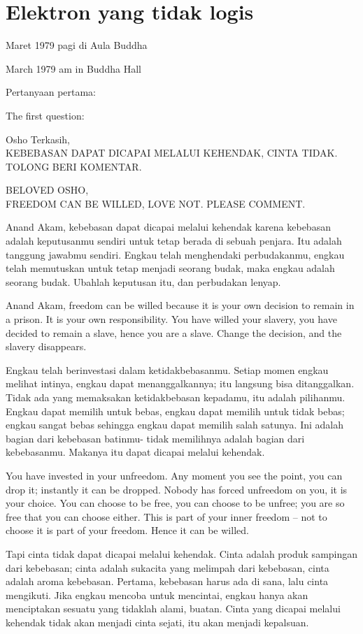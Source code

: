 \chapter{Elektron yang tidak logis} %

 Maret 1979 pagi di Aula Buddha

 March 1979 am in Buddha Hall

\bahasa
Pertanyaan pertama:

\english
The first question:

\bahasa
Osho Terkasih,\\
KEBEBASAN DAPAT DICAPAI MELALUI KEHENDAK, CINTA TIDAK. TOLONG BERI KOMENTAR.

\english
BELOVED OSHO,\\
FREEDOM CAN BE WILLED, LOVE NOT. PLEASE COMMENT.

\bahasa
Anand Akam, kebebasan dapat dicapai melalui kehendak karena kebebasan adalah keputusanmu sendiri untuk tetap berada di sebuah penjara. Itu adalah tanggung jawabmu sendiri. Engkau telah menghendaki perbudakanmu, engkau telah memutuskan untuk tetap menjadi seorang budak, maka engkau adalah seorang budak. Ubahlah keputusan itu, dan perbudakan lenyap.

\english
Anand Akam, freedom can be willed because it is your own decision to remain in a
prison. It is your own responsibility. You have willed your slavery, you have decided to remain a slave, hence you are a slave. Change the decision, and the slavery disappears.

\bahasa
Engkau telah berinvestasi dalam ketidakbebasanmu. Setiap momen engkau melihat intinya, engkau dapat menanggalkannya; itu langsung bisa ditanggalkan. Tidak ada yang memaksakan ketidakbebasan kepadamu, itu adalah pilihanmu. Engkau dapat memilih untuk bebas, engkau dapat memilih untuk tidak bebas; engkau sangat bebas sehingga engkau dapat memilih salah satunya. Ini adalah bagian dari kebebasan batinmu- tidak memilihnya adalah bagian dari kebebasanmu. Makanya itu dapat dicapai melalui kehendak.

\english
You have invested in your unfreedom. Any moment you see the point, you can drop it; instantly it can be dropped. Nobody has forced unfreedom on you, it is your choice. You can choose to be free, you can choose to be unfree; you are so free that you can choose either. This is part of your inner freedom -- not to choose it is part of your freedom. Hence it can be willed.

\bahasa
Tapi cinta tidak dapat dicapai melalui kehendak. Cinta adalah produk sampingan dari kebebasan; cinta adalah sukacita yang melimpah dari kebebasan, cinta adalah aroma kebebasan. Pertama, kebebasan harus ada di sana, lalu cinta mengikuti. Jika engkau mencoba untuk mencintai, engkau hanya akan menciptakan sesuatu yang tidaklah alami, buatan. Cinta yang dicapai melalui kehendak tidak akan menjadi cinta sejati, itu akan menjadi kepalsuan.

